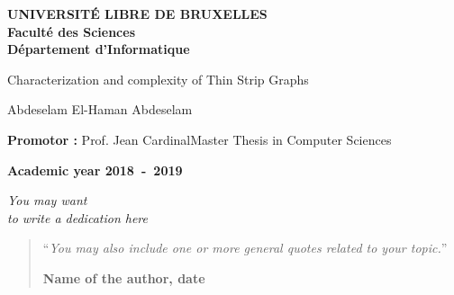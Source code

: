 \documentclass[11pt,a4paper,oneside]{book}
\begin{document}
\frontmatter
\begin{titlepage}
\begin{center}
\textbf{UNIVERSIT\'E LIBRE DE BRUXELLES}\\
\textbf{Facult\'e des Sciences}\\
\textbf{D\'epartement d'Informatique}
\vfill{}\vfill{}

{\Huge  Characterization and complexity of \vspace*{.5cm} \linebreak[4] Thin Strip Graphs}


{\Huge \par}
\begin{center}{\LARGE Abdeselam El-Haman Abdeselam}\end{center}{\Huge \par}
\vfill{}\vfill{}
\begin{flushright}{\large \textbf{Promotor :} Prof. Jean Cardinal}\hfill{}{\large Master Thesis in Computer Sciences}\\
{\large }\hfill{}{}\end{flushright}{\large\par}
\vfill{}\vfill{}\enlargethispage{3cm}
\textbf{Academic year 2018~-~2019}
\end{center}
\end{titlepage}
\newpage
\thispagestyle{empty}
\null

\newenvironment{vcenterpage}
{\newpage\thispagestyle{empty}
\vspace*{\fill}}
{\vspace*{\fill}\par\pagebreak}

\begin{vcenterpage}
\begin{flushright}
    \large\em\null\vskip1in
    You may want\\
   to write a dedication here\vfill
  \end{flushright}
\end{vcenterpage}
\thispagestyle{empty}
\vspace*{5cm}

\begin{quotation}
\noindent ``\emph{You may also include one or more general quotes related to your topic.}''
\begin{flushright}\textbf{Name of the author, date}\end{flushright}
\end{quotation}
\end{document}
